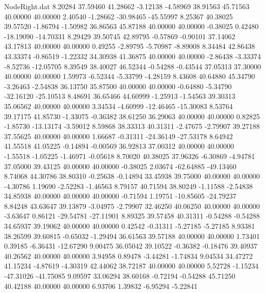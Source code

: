 \begin{filecontents}{NodeRight.dat}
   8.20284   37.59460   41.28662    -3.12138   -4.58969   38.91563   45.71563   40.00000   40.00000    2.40540   -1.28662  -30.98465  -45.55997
   8.25367   40.38025   39.57520    -1.86794   -1.50982   36.86563   45.87188   40.00000   40.00000   -0.38025    0.42480  -18.19090  -14.70331
   8.29429   39.50745   42.89795    -0.57869   -0.90101   37.14062   43.17813   40.00000   40.00000    0.49255   -2.89795   -5.70987   -8.89008
   8.34484   42.86438   43.33374    -0.86519   -1.22332   34.30938   41.36875   40.00000   40.00000   -2.86438   -3.33374   -8.52736  -12.05705
   8.39549   38.40027   46.52344    -0.54288   -0.43544   37.05313   37.30000   40.00000   40.00000    1.59973   -6.52344   -5.33799   -4.28159
   8.43608   40.64880   45.34790    -3.26463   -2.54838   36.13750   35.87500   40.00000   40.00000   -0.64880   -5.34790  -32.16120  -25.10513
   8.48691   36.65466   44.60999    -1.25913   -1.54563   39.30313   35.06562   40.00000   40.00000    3.34534   -4.60999  -12.46465  -15.30083
   8.53764   39.17175   41.85730    -1.33075   -0.36382   38.61250   36.29063   40.00000   40.00000    0.82825   -1.85730  -13.13174   -3.59012
   8.59868   38.33313   40.31311    -2.47675   -2.79907   39.27188   37.55625   40.00000   40.00000    1.66687   -0.31311  -24.36149  -27.53178
   8.64942   41.55518   41.05225    -0.14894   -0.00569   36.92813   37.00312   40.00000   40.00000   -1.55518   -1.05225   -1.46971   -0.05618
   8.70020   40.38025   37.96326    -6.30869   -4.94781   37.05000   39.43125   40.00000   40.00000   -0.38025    2.03674  -62.64885  -49.13460
   8.74068   44.30786   38.80310    -0.25638   -0.14894   33.45938   39.75000   40.00000   40.00000   -4.30786    1.19690   -2.52283   -1.46563
   8.79157   40.71594   38.80249    -1.11588   -2.54838   34.85938   40.00000   40.00000   40.00000   -0.71594    1.19751  -10.85605  -24.79237
   8.84248   43.63647   39.13879    -3.04975   -2.79907   32.46250   40.06250   40.00000   40.00000   -3.63647    0.86121  -29.54781  -27.11901
   8.89325   39.57458   40.31311    -0.54288   -0.54288   34.65937   39.19062   40.00000   40.00000    0.42542   -0.31311   -5.27185   -5.27185
   8.93381   38.26599   39.60815    -0.65032   -1.29494   36.61563   39.57188   40.00000   40.00000    1.73401    0.39185   -6.36431  -12.67290
   9.00475   36.05042   39.10522    -0.36382   -0.18476   39.40937   40.26562   40.00000   40.00000    3.94958    0.89478   -3.44281   -1.74834
   9.04534   34.47272   41.15234    -4.87619   -4.30319   42.44062   38.72187   40.00000   40.00000    5.52728   -1.15234  -47.31026  -41.75085
   9.09597   33.06294   38.60168    -0.72194   -0.54288   45.71250   40.42188   40.00000   40.00000    6.93706    1.39832   -6.95294   -5.22841

\end{filecontents}
